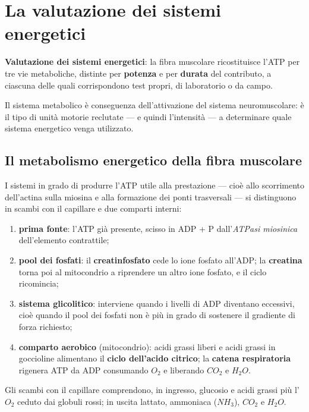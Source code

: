 \chapter{La valutazione dei sistemi energetici}
\label{cap:sistemienergetici}

\textbf{Valutazione dei sistemi energetici}: la fibra muscolare ricostituisce l'ATP per tre vie
metaboliche, distinte per \textbf{potenza} e per \textbf{durata} del contributo, a ciascuna delle
quali corrispondono test propri, di laboratorio o da campo.

Il sistema metabolico è conseguenza dell'attivazione del sistema neuromuscolare: è il tipo di unità
motorie reclutate --- e quindi l'intensità --- a determinare quale sistema energetico venga
utilizzato.

\section{Il metabolismo energetico della fibra muscolare}

I sistemi in grado di produrre l'ATP utile alla prestazione --- cioè allo scorrimento dell'actina
sulla miosina e alla formazione dei ponti trasversali --- si distinguono in scambi con il capillare
e due comparti interni:
\begin{enumerate}
  \item \textbf{prima fonte}: l'ATP già presente, scisso in ADP + P dall'\textit{ATPasi miosinica}
    dell'elemento contrattile;
  \item \textbf{pool dei fosfati}: il \textbf{creatinfosfato} cede lo ione fosfato all'ADP; la
    \textbf{creatina} torna poi al mitocondrio a riprendere un altro ione fosfato, e il ciclo
    ricomincia;
  \item \textbf{sistema glicolitico}: interviene quando i livelli di ADP diventano eccessivi, cioè
    quando il pool dei fosfati non è più in grado di sostenere il gradiente di forza richiesto;
  \item \textbf{comparto aerobico} (mitocondrio): acidi grassi liberi e acidi grassi in goccioline
    alimentano il \textbf{ciclo dell'acido citrico}; la \textbf{catena respiratoria} rigenera ATP da
    ADP consumando $O_2$ e liberando $CO_2$ e $H_2O$.
\end{enumerate}
Gli scambi con il capillare comprendono, in ingresso, glucosio e acidi grassi più l'$O_2$ ceduto dai
globuli rossi; in uscita lattato, ammoniaca ($NH_3$), $CO_2$ e $H_2O$.

